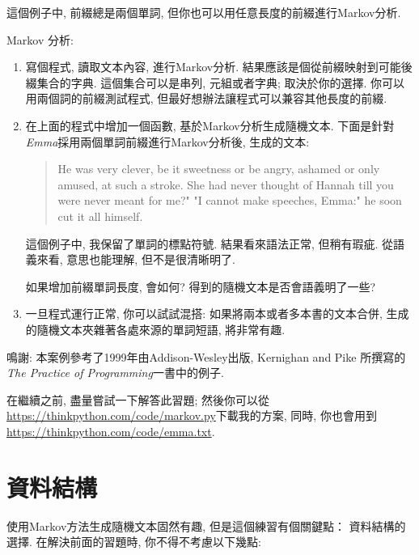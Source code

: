 \documentclass[10pt]{book}
\begin{document}
這個例子中, 前綴總是兩個單詞, 但你也可以用任意長度的前綴進行Markov分析. 

\begin{exercise}

Markov 分析:

\begin{enumerate}

\item 寫個程式, 讀取文本內容, 進行Markov分析. 
結果應該是個從前綴映射到可能後綴集合的字典. 
這個集合可以是串列, 元組或者字典; 取決於你的選擇. 
你可以用兩個詞的前綴測試程式, 但最好想辦法讓程式可以兼容其他長度的前綴. 

\item 在上面的程式中增加一個函數, 基於Markov分析生成隨機文本. 
下面是針對 {\em Emma}採用兩個單詞前綴進行Markov分析後, 生成的文本:

\begin{quote}
He was very clever, be it sweetness or be angry, ashamed or only
amused, at such a stroke. She had never thought of Hannah till you
were never meant for me?" "I cannot make speeches, Emma:" he soon cut
it all himself.
\end{quote}

這個例子中, 我保留了單詞的標點符號. 
結果看來語法正常, 但稍有瑕疵. 
從語義來看, 意思也能理解, 但不是很清晰明了. 

如果增加前綴單詞長度, 會如何? 得到的隨機文本是否會語義明了一些?

\item 一旦程式運行正常, 你可以試試混搭: 
如果將兩本或者多本書的文本合併, 生成的隨機文本夾雜著各處來源的單詞短語, 將非常有趣. 

\end{enumerate}

鳴謝: 本案例參考了1999年由Addison-Wesley出版, Kernighan and Pike
所撰寫的{\em The Practice of Programming}一書中的例子. 
\end{exercise}

在繼續之前, 盡量嘗試一下解答此習題; 然後你可以從 
\url{https://thinkpython.com/code/markov.py}下載我的方案, 同時, 
你也會用到\url{https://thinkpython.com/code/emma.txt}.


\section{資料結構}

使用Markov方法生成隨機文本固然有趣, 但是這個練習有個關鍵點：
資料結構的選擇. 在解決前面的習題時, 你不得不考慮以下幾點:
\end{document}
